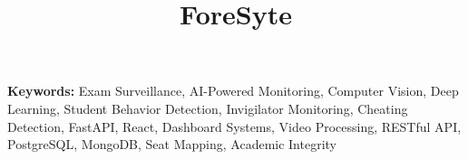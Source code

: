 \documentclass{fast-nuces-bs}
\title{ForeSyte}
\newenvironment{keywords}
  {\small\noindent\textbf{Keywords:} }
  {}
\begin{document}


\begin{keywords}
Exam Surveillance, AI-Powered Monitoring, Computer Vision, Deep Learning, Student Behavior Detection, Invigilator Monitoring, Cheating Detection, FastAPI, React, Dashboard Systems, Video Processing, RESTful API, PostgreSQL, MongoDB, Seat Mapping, Academic Integrity
\end{keywords}






%




\appendix

\end{document}
